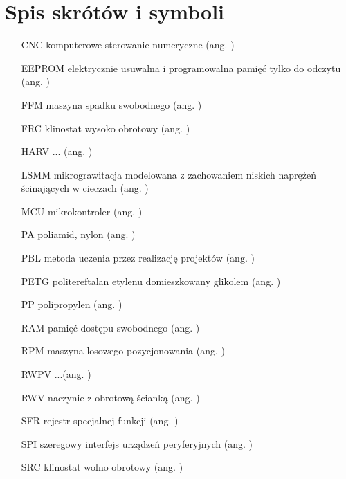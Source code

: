 \chapter*{Spis skrótów i symboli}

\begin{itemize}
	
	\item[CNC] komputerowe sterowanie numeryczne ({ang. })
	\item[EEPROM] elektrycznie usuwalna i programowalna pamięć tylko do odczytu ({ang. })
	\item[FFM] maszyna spadku swobodnego ({ang. })
	\item[FRC] klinostat wysoko obrotowy  ({ang. })
	\item[HARV] ...  ({ang. })
	\item[LSMM] mikrograwitacja modelowana z zachowaniem niskich naprężeń ścinających w cieczach  (ang. )
	\item[MCU] mikrokontroler (ang. )
	\item[PA] poliamid, nylon ({ang. })
	\item[PBL] metoda uczenia przez realizację projektów   ({ang. })
	\item[PETG] politereftalan etylenu domieszkowany glikolem  ({ang. })
	\item[PP] polipropylen ({ang. })
	\item[RAM] pamięć dostępu swobodnego ({ang. })
	\item[RPM] maszyna losowego pozycjonowania ({ang. })
	\item[RWPV] ...({ang. })
	\item[RWV] naczynie z obrotową ścianką  ({ang. })
	\item[SFR] rejestr specjalnej funkcji ({ang. })
	\item[SPI] szeregowy interfejs urządzeń peryferyjnych ({ang. })
	\item[SRC] klinostat wolno obrotowy ({ang. })

\end{itemize}
